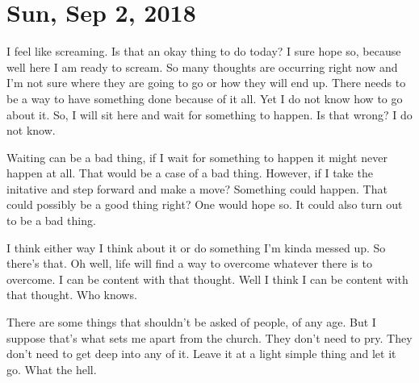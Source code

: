 \section{Sun, Sep 2, 2018}

I feel like screaming. Is that an okay thing to do today? I sure hope so, because
well here I am ready to scream. So many thoughts are occurring right now and I'm not
sure where they are going to go or how they will end up. There needs to be a way to
have something done because of it all. Yet I do not know how to go about it. So, I
will sit here and wait for something to happen. Is that wrong? I do not know.

Waiting can be a bad thing, if I wait for something to happen it might never happen
at all. That would be a case of a bad thing. However, if I take the initative and
step forward and make a move? Something could happen. That could possibly be a good
thing right? One would hope so. It could also turn out to be a bad thing.

I think either way I think about it or do something I'm kinda messed up. So there's
that. Oh well, life will find a way to overcome whatever there is to overcome. I can
be content with that thought. Well I think I can be content with that thought. Who
knows.

There are some things that shouldn't be asked of people, of any age. But I suppose
that's what sets me apart from the church. They don't need to pry. They don't need to
get deep into any of it. Leave it at a light simple thing and let it go. What the
hell.

